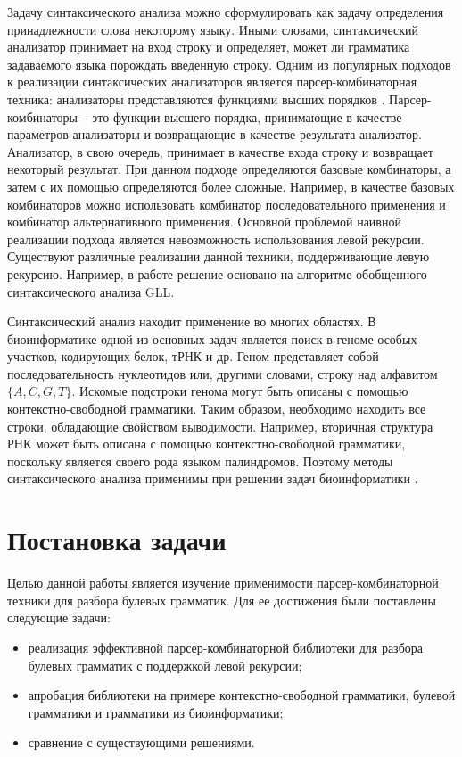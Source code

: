 Задачу синтаксического анализа можно сформулировать как задачу определения принадлежности слова некоторому языку. Иными словами, синтаксический анализатор принимает на вход строку и определяет, может ли грамматика задаваемого языка порождать введенную строку. Одним из популярных подходов к реализации синтаксических анализаторов является парсер-комбинаторная техника: анализаторы представляются функциями высших порядков \cite{hutton1996monadic}. Парсер-комбинаторы -- это функции высшего порядка, принимающие в качестве параметров анализаторы и возвращающие в качестве результата анализатор. Анализатор, в свою очередь, принимает в качестве входа строку и возвращает некоторый результат. При данном подходе определяются базовые комбинаторы, а затем с их помощью определяются более сложные. Например, в качестве базовых комбинаторов можно использовать комбинатор последовательного применения и комбинатор альтернативного применения. 
Основной проблемой наивной реализации подхода является невозможность использования левой рекурсии. Существуют различные реализации данной техники, поддерживающие левую рекурсию. Например, в работе \cite{spiewak2010generalized} решение основано на алгоритме обобщенного синтаксического анализа GLL.


Синтаксический анализ находит применение во многих областях. В биоинформатике одной из основных задач является поиск в геноме особых участков, кодирующих белок, тРНК и др. Геном представляет собой последовательность нуклеотидов или, другими словами, строку над алфавитом $\{A, C, G, T\}$. Искомые подстроки генома могут быть описаны с помощью контекстно-свободной грамматики. Таким образом, необходимо находить все строки, обладающие свойством выводимости. Например, вторичная структура РНК может быть описана с помощью контекстно-свободной грамматики, поскольку является своего рода языком палиндромов. Поэтому методы синтаксического анализа применимы при решении задач биоинформатики \cite{sippl1999biological}.

\section{Постановка задачи}

Целью данной работы является изучение применимости парсер-комбинаторной техники
для разбора булевых грамматик. Для ее достижения были поставлены следующие задачи:

\begin{itemize}
    \item реализация эффективной парсер-комбинаторной библиотеки для разбора булевых грамматик с поддержкой левой рекурсии;
    \item апробация библиотеки на примере контекстно-свободной грамматики, булевой грамматики и грамматики из биоинформатики;
    \item сравнение с существующими решениями.
\end{itemize}


